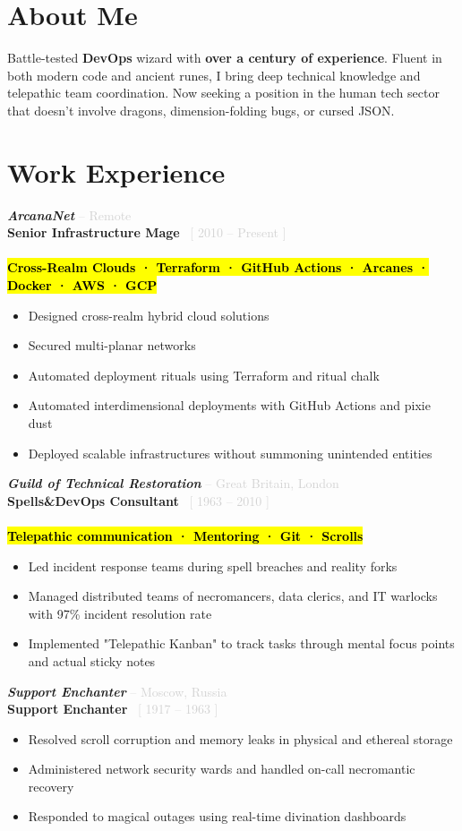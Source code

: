 \documentclass[9pt,a4paper]{article}
\newcommand{\dates}[1]{%
  \textcolor{LIGHTGRAY}{[ #1 ]}
}
\newcommand{\jobentry}[4]{%
 \vspace{0.6em}%
 \textcolor{LABELGRAY}{\faBuilding[regular]} \textcolor{MEDIUMGRAY}{ \noindent\textit{\textbf{#1  }}\textcolor{LIGHTGRAY}{–  #2} }\\[0.3em]
 \noindent\textbf{\textcolor{LABELGRAY}{#4}}\ \dates{#3} \\[-1.1em]
}
\newcommand{\skillsline}[1]{%
  \\[0.3em]
  \textcolor{LABELGRAY}{\hl{\textbf{#1}}}
}
\begin{document}
\vspace{1.2em}

\section*{About Me}
Battle-tested \textbf{DevOps} wizard with \textbf{over a century of experience}. Fluent in both modern code and ancient runes, I bring deep technical knowledge and telepathic team coordination. Now seeking a position in the human tech sector that doesn’t involve dragons, dimension-folding bugs, or cursed JSON.


\section*{Work Experience}

\jobentry{ArcanaNet}{Remote}{2010 – Present}{Senior Infrastructure Mage}
\skillsline{Cross-Realm Clouds · Terraform · GitHub Actions · Arcanes · Docker · AWS · GCP}
\begin{itemize}
  \item Designed cross-realm hybrid cloud solutions 
  \item Secured multi-planar networks
  \item Automated deployment rituals using Terraform and ritual chalk
  \item Automated interdimensional deployments with GitHub Actions and pixie dust
  \item Deployed scalable infrastructures without summoning unintended entities
\end{itemize}

\jobentry{Guild of Technical Restoration}{Great Britain, London}{1963 – 2010}{Spells\&DevOps Consultant}
\skillsline{Telepathic communication · Mentoring · Git · Scrolls}
\begin{itemize}
   \item Led incident response teams during spell breaches and reality forks
   \item Managed distributed teams of necromancers, data clerics, and IT warlocks with 97\% incident resolution rate 
   \item Implemented "Telepathic Kanban" to track tasks through mental focus points and actual sticky notes
\end{itemize}

\jobentry{Support Enchanter}{Moscow, Russia}{1917 – 1963}{Support Enchanter}
\begin{itemize}
  \item Resolved scroll corruption and memory leaks in physical and ethereal storage
  \item Administered network security wards and handled on-call necromantic recovery
  \item Responded to magical outages using real-time divination dashboards
\end{itemize}
\end{document}
